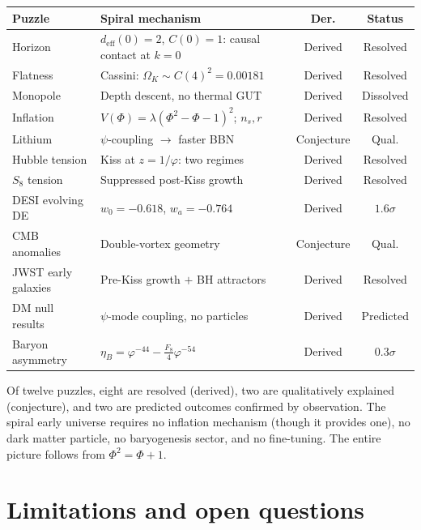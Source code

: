 \documentclass[12pt,a4paper]{article}
\begin{document}
\begin{center}\small
\begin{tabular}{l|p{4.4cm}|c|c}
\textbf{Puzzle} & \textbf{Spiral mechanism} & \textbf{Der.} & \textbf{Status} \\
\hline
Horizon & $d_{\mathrm{eff}}(0)=2$, $C(0)=1$: causal contact at $k{=}0$ & Derived & Resolved \\
Flatness & Cassini: $\Omega_K \sim C(4)^2 = 0.00181$ & Derived & Resolved \\
Monopole & Depth descent, no thermal GUT & Derived & Dissolved \\
Inflation & $V(\Phi)=\lambda(\Phi^2{-}\Phi{-}1)^2$; $n_s,r$ & Derived & Resolved \\
Lithium & $\psi$-coupling $\to$ faster BBN & Conjecture & Qual. \\
Hubble tension & Kiss at $z=1/\varphi$: two regimes & Derived & Resolved \\
$S_8$ tension & Suppressed post-Kiss growth & Derived & Resolved \\
DESI evolving DE & $w_0=-0.618$, $w_a=-0.764$ & Derived & $1.6\sigma$ \\
CMB anomalies & Double-vortex geometry & Conjecture & Qual. \\
JWST early galaxies & Pre-Kiss growth $+$ BH attractors & Derived & Resolved \\
DM null results & $\psi$-mode coupling, no particles & Derived & Predicted \\
Baryon asymmetry & $\eta_B = \varphi^{-44}{-}\tfrac{F_8}{4}\varphi^{-54}$ & Derived & $0.3\sigma$ \\
\end{tabular}
\end{center}

\noindent Of twelve puzzles, eight are resolved (derived), two are qualitatively explained (conjecture), and two are predicted outcomes confirmed by observation. The spiral early universe requires no inflation mechanism (though it provides one), no dark matter particle, no baryogenesis sector, and no fine-tuning.  The entire picture follows from $\Phi^2 = \Phi + 1$.

\section{Limitations and open questions}
\label{sec:limitations}
\end{document}
